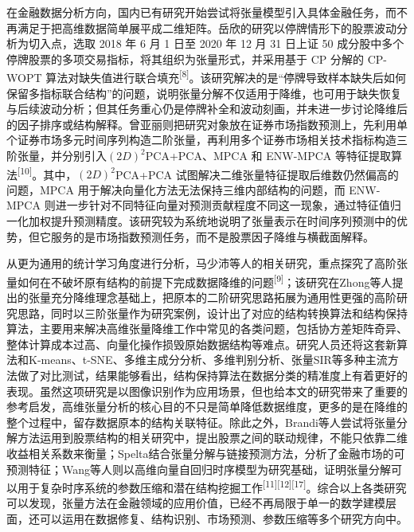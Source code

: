 在金融数据分析方向，国内已有研究开始尝试将张量模型引入具体金融任务，而不再满足于把高维数据简单展平成二维矩阵。岳欣的研究以停牌情形下的股票波动分析为切入点，选取 2018 年 6 月 1 日至 2020 年 12 月 31 日上证 50 成分股中多个停牌股票的多项交易指标，将其组织为张量形式，并采用基于 CP 分解的 CP-WOPT 算法对缺失值进行联合填充\textsuperscript{[8]}。该研究解决的是“停牌导致样本缺失后如何保留多指标联合结构”的问题，说明张量分解不仅适用于降维，也可用于缺失恢复与后续波动分析；但其任务重心仍是停牌补全和波动刻画，并未进一步讨论降维后的因子排序或结构解释。曾亚丽则把研究对象放在证券市场指数预测上，先利用单个证券市场多元时间序列构造二阶张量，再利用多个证券市场相关技术指标构造三阶张量，并分别引入$(2D)^2$PCA+PCA、MPCA 和 ENW-MPCA 等特征提取算法\textsuperscript{[10]}。其中，$(2D)^2$PCA+PCA 试图解决二维张量特征提取后维数仍然偏高的问题，MPCA 用于解决向量化方法无法保持三维内部结构的问题，而 ENW-MPCA 则进一步针对不同特征向量对预测贡献程度不同这一现象，通过特征值归一化加权提升预测精度。该研究较为系统地说明了张量表示在时间序列预测中的优势，但它服务的是市场指数预测任务，而不是股票因子降维与横截面解释。

从更为通用的统计学习角度进行分析，马少沛等人的相关研究，重点探究了高阶张量如何在不破坏原有结构的前提下完成数据降维的问题\textsuperscript{[9]}；该研究在Zhong等人提出的张量充分降维理念基础上，把原本的二阶研究思路拓展为通用性更强的高阶研究思路，同时以三阶张量作为研究案例，设计出了对应的结构转换算法和结构保持算法，主要用来解决高维张量降维工作中常见的各类问题，包括协方差矩阵奇异、整体计算成本过高、向量化操作损毁原始数据结构等难点。研究人员还将这套新算法和K-means、t-SNE、多维主成分分析、多维判别分析、张量SIR等多种主流方法做了对比测试，结果能够看出，结构保持算法在数据分类的精准度上有着更好的表现。虽然这项研究是以图像识别作为应用场景，但也给本文的研究带来了重要的参考启发，高维张量分析的核心目的不只是简单降低数据维度，更多的是在降维的整个过程中，留存数据原本的结构关联特征。除此之外，Brandi等人尝试将张量分解方法运用到股票结构的相关研究中，提出股票之间的联动规律，不能只依靠二维收益相关系数来衡量；Spelta结合张量分解与链接预测方法，分析了金融市场的可预测特征；Wang等人则以高维向量自回归时序模型为研究基础，证明张量分解可以用于复杂时序系统的参数压缩和潜在结构挖掘工作\textsuperscript{[11][12][17]}。综合以上各类研究可以发现，张量方法在金融领域的应用价值，已经不再局限于单一的数学建模层面，还可以运用在数据修复、结构识别、市场预测、参数压缩等多个研究方向中。

